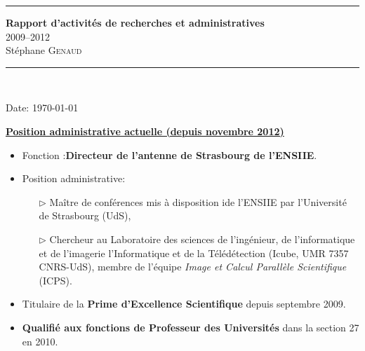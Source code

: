 \documentclass[11pt]{article}
\begin{document}
\thispagestyle{empty}



\noindent
\rule{\linewidth}{1mm}
\begin{center}
\Large{\textbf{Rapport d'activités de recherches et administratives}}\\[3mm]
\Large{2009--2012}\\[3mm]
\Large{Stéphane \textsc{Genaud}}\\[1cm]

\rule{\linewidth}{1mm}
\\
\vspace{3cm}
\end{center}
\begin{center}
Date: \today\\
\end{center}

\newpage

\setlength{\parindent}{5mm} %
\setlength{\parindent}{0mm}


\vspace{8mm}
\textbf{\underline{Position administrative actuelle (depuis novembre 2012)}}
\vspace{5mm}

\begin{itemize}
\item Fonction :\textbf{Directeur de l'antenne de Strasbourg de l'ENSIIE}.\\[1mm]
       
\item Position administrative: 
   \begin{itemize}
	\item[$\rhd$] Maître de conférences mis à disposition ide l'ENSIIE par l'Université de Strasbourg (UdS),
	\item[$\rhd$] Chercheur au Laboratoire des sciences de l'ingénieur, de l'informatique et de l'imagerie
	  l'Informatique et de la Télédétection (Icube, UMR 7357 CNRS-UdS),
          membre de l'équipe \textit{Image et Calcul Parallèle Scientifique} (ICPS).\\
   \end{itemize}

\item Titulaire de la \textbf{Prime d'Excellence Scientifique} depuis septembre 2009.\\

\item \textbf{Qualifié aux fonctions de Professeur des Universités} dans la 
              section 27 en 2010.\\
	\\[2mm]
\end{itemize}
\end{document}
